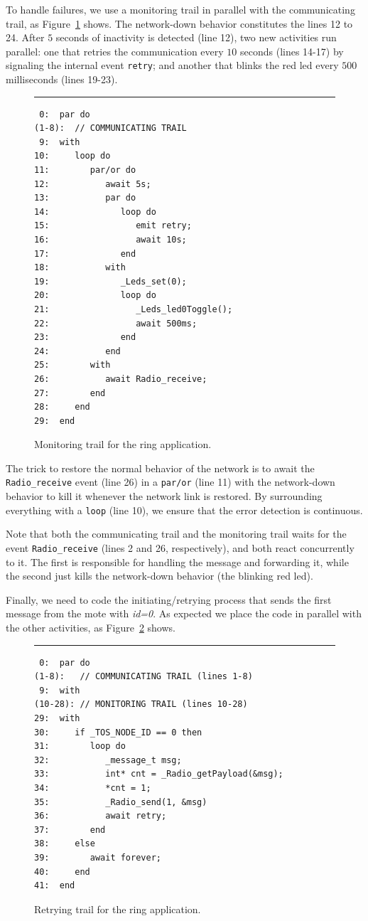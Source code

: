 \documentclass{sigplan-proc}
\newcommand{\2}{\;\;}
\newcommand{\5}{\;\;\;\;\;}
\newcommand{\code}[1] {{\small{\texttt{#1}}}}
\begin{document}
To handle failures, we use a monitoring trail in parallel with the 
communicating trail, as Figure~\ref{lst:demos:ring:2} shows.
The network-down behavior constitutes the lines 12 to 24.
After $5$ seconds of inactivity is detected (line 12), two new activities run 
parallel: one that retries the communication every $10$ seconds (lines 14-17) 
by signaling the internal event \code{retry}; and another that blinks the red 
led every $500$ milliseconds (lines 19-23).

\begin{figure}[t]
\rule{8.5cm}{0.37pt}
{\small
\begin{verbatim}
 0:  par do
(1-8):  // COMMUNICATING TRAIL
 9:  with
10:     loop do
11:        par/or do
12:           await 5s;
13:           par do
14:              loop do
15:                 emit retry;
16:                 await 10s;
17:              end
18:           with
19:              _Leds_set(0);
20:              loop do
21:                 _Leds_led0Toggle();
22:                 await 500ms;
23:              end
24:           end
25:        with
26:           await Radio_receive;
27:        end
28:     end
29:  end
\end{verbatim}
}
\caption{ Monitoring trail for the ring application.
\label{lst:demos:ring:2}
}
\end{figure}

The trick to restore the normal behavior of the network is to await the 
\code{Radio\_receive} event (line 26) in a \code{par/or} (line 11) with the 
network-down behavior to kill it whenever the network link is restored.
By surrounding everything with a \code{loop} (line 10), we ensure that the 
error detection is continuous.

Note that both the communicating trail and the monitoring trail waits for the 
event \code{Radio\_receive} (lines 2 and 26, respectively), and both react 
concurrently to it.
The first is responsible for handling the message and forwarding it, while the 
second just kills the network-down behavior (the blinking red led).

Finally, we need to code the initiating/retrying process that sends the first 
message from the mote with \emph{id=0}.
As expected we place the code in parallel with the other activities, as 
Figure~\ref{lst:demos:ring:3} shows.

\begin{figure}[t]
\rule{8.5cm}{0.37pt}
{\small
\begin{verbatim}
 0:  par do
(1-8):   // COMMUNICATING TRAIL (lines 1-8)
 9:  with
(10-28): // MONITORING TRAIL (lines 10-28)
29:  with
30:     if _TOS_NODE_ID == 0 then
31:        loop do
32:           _message_t msg;
33:           int* cnt = _Radio_getPayload(&msg);
34:           *cnt = 1;
35:           _Radio_send(1, &msg)
36:           await retry;
37:        end
38:     else
39:        await forever;
40:     end
41:  end
\end{verbatim}
}
\caption{ Retrying trail for the ring application.
\label{lst:demos:ring:3}
}
\end{figure}
\end{document}
